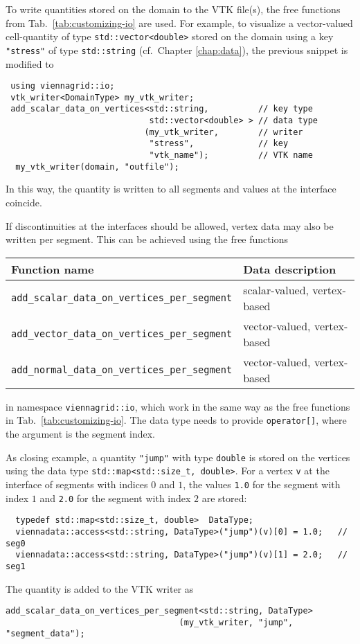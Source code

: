  To write quantities stored on the domain to the VTK file(s), the free functions from Tab.~\ref{tab:customizing-io} are used.
 For example, to visualize a vector-valued cell-quantity of type \lstinline|std::vector<double>| stored on the domain using a key \lstinline|"stress"| of type \lstinline|std::string| (cf.~Chapter \ref{chap:data}), the previous snippet is modified to
 \begin{lstlisting}
 using viennagrid::io;
 vtk_writer<DomainType> my_vtk_writer;
 add_scalar_data_on_vertices<std::string,          // key type
                             std::vector<double> > // data type
                            (my_vtk_writer,        // writer
                             "stress",             // key
                             "vtk_name");          // VTK name
  my_vtk_writer(domain, "outfile");
 \end{lstlisting}
 In this way, the quantity is written to all segments and values at the interface coincide.

 If discontinuities at the interfaces should be allowed, vertex data may also be written per segment.
 This can be achieved using the free functions
 \begin{center}
  \begin{tabular}{|l|l|}
   \hline
   Function name & Data description \\
   \hline
   \lstinline|add_scalar_data_on_vertices_per_segment| & scalar-valued, vertex-based \\
   \lstinline|add_vector_data_on_vertices_per_segment| & vector-valued, vertex-based \\
   \lstinline|add_normal_data_on_vertices_per_segment| & vector-valued, vertex-based \\
   \hline
  \end{tabular}
 \end{center}
 in namespace \lstinline|viennagrid::io|,
 which work in the same way as the free functions in Tab.~\ref{tab:customizing-io}.
 The data type needs to provide \lstinline|operator[]|, where the argument is the segment index.
 
 As closing example, a quantity \lstinline|"jump"| with type \lstinline|double| is stored on the vertices
 using the {\ViennaData} data type \lstinline|std::map<std::size_t, double>|. 
 For a vertex \lstinline|v| at the interface of segments with indices $0$ and $1$, the values \lstinline|1.0| for the segment with index $1$ and \lstinline|2.0| for the segment with index $2$ are stored:
 \begin{lstlisting}
  typedef std::map<std::size_t, double>  DataType;
  viennadata::access<std::string, DataType>("jump")(v)[0] = 1.0;   // seg0
  viennadata::access<std::string, DataType>("jump")(v)[1] = 2.0;   // seg1
 \end{lstlisting}
 The quantity is added to the VTK writer as
 \begin{lstlisting}
add_scalar_data_on_vertices_per_segment<std::string, DataType>
                                   (my_vtk_writer, "jump", "segment_data");
 \end{lstlisting}

